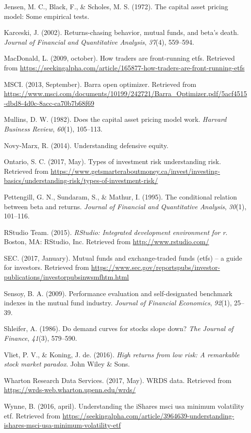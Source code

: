 \documentclass[12pt,twoside]{reedthesis}
\theoremstyle{definition}
\theoremstyle{definition}
\theoremstyle{definition}
\theoremstyle{remark}
\begin{document}
\hypertarget{ref-jensen1972}{}
Jensen, M. C., Black, F., \& Scholes, M. S. (1972). The capital asset
pricing model: Some empirical tests.

\hypertarget{ref-karceski2002}{}
Karceski, J. (2002). Returns-chasing behavior, mutual funds, and beta's
death. \emph{Journal of Financial and Quantitative Analysis},
\emph{37}(4), 559--594.

\hypertarget{ref-macdonald2009}{}
MacDonald, L. (2009, october). How traders are front-running etfs.
Retrieved from
\url{https://seekingalpha.com/article/165877-how-traders-are-front-running-etfs}

\hypertarget{ref-msci2013}{}
MSCI. (2013, September). Barra open optimizer. Retrieved from
\url{https://www.msci.com/documents/10199/242721/Barra_Optimizer.pdf/5acf4515-dbd8-4d0c-8acc-ca70b7b68f69}

\hypertarget{ref-mullins1982}{}
Mullins, D. W. (1982). Does the capital asset pricing model work.
\emph{Harvard Business Review}, \emph{60}(1), 105--113.

\hypertarget{ref-novy2014}{}
Novy-Marx, R. (2014). Understanding defensive equity.

\hypertarget{ref-ontario2017}{}
Ontario, S. C. (2017, May). Types of investment risk \textbar{}
understanding risk. Retrieved from
\url{https://www.getsmarteraboutmoney.ca/invest/investing-basics/understanding-risk/types-of-investment-risk/}

\hypertarget{ref-pettengill1995}{}
Pettengill, G. N., Sundaram, S., \& Mathur, I. (1995). The conditional
relation between beta and returns. \emph{Journal of Financial and
Quantitative Analysis}, \emph{30}(1), 101--116.

\hypertarget{ref-rstudio2017}{}
RStudio Team. (2015). \emph{RStudio: Integrated development environment
for r}. Boston, MA: RStudio, Inc. Retrieved from
\url{http://www.rstudio.com/}

\hypertarget{ref-sec2017}{}
SEC. (2017, January). Mutual funds and exchange-traded funds (etfs) -- a
guide for investors. Retrieved from
\url{https://www.sec.gov/reportspubs/investor-publications/investorpubsinwsmfhtm.html}

\hypertarget{ref-sensoy2009}{}
Sensoy, B. A. (2009). Performance evaluation and self-designated
benchmark indexes in the mutual fund industry. \emph{Journal of
Financial Economics}, \emph{92}(1), 25--39.

\hypertarget{ref-shleifer1986}{}
Shleifer, A. (1986). Do demand curves for stocks slope down? \emph{The
Journal of Finance}, \emph{41}(3), 579--590.

\hypertarget{ref-van2016}{}
Vliet, P. V., \& Koning, J. de. (2016). \emph{High returns from low
risk: A remarkable stock market paradox}. John Wiley \& Sons.

\hypertarget{ref-wrds2017}{}
Wharton Research Data Services. (2017, May). WRDS data. Retrieved from
\url{https://wrds-web.wharton.upenn.edu/wrds/}

\hypertarget{ref-wynne2016}{}
Wynne, B. (2016, april). Understanding the iShares msci usa minimum
volatility etf. Retrieved from
\url{https://seekingalpha.com/article/3964639-understanding-ishares-msci-usa-minimum-volatility-etf}


\end{document}
